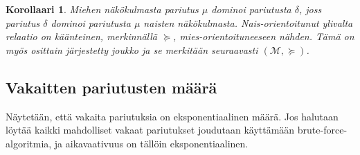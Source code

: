 \documentclass[finnish]{tktltiki2}
\newtheorem{kor}[lau]{Korollaari}
\theoremstyle{definition}
\theoremstyle{remark}
\begin{document}
\begin{kor}\cite[s. 19]{gusfield1989stable}
Miehen näkökulmasta pariutus $\mu$ dominoi pariutusta $\delta$, joss pariutus $\delta$ dominoi pariutusta $\mu$ naisten näkökulmasta. \emph{Nais-orientoitunut} ylivalta relaatio on käänteinen, merkinnällä $\succeq$, mies-orientoituneeseen nähden. Tämä on myös osittain järjestetty joukko ja se merkitään seuraavasti $(\mathcal{M}, \succeq)$. 
\end{kor}

\subsection{Vakaitten pariutusten määrä}
Näytetään, että vakaita pariutuksia on eksponentiaalinen määrä. Jos halutaan löytää kaikki mahdolliset vakaat pariutukset joudutaan käyttämään brute-force-algoritmia, ja aikavaativuus on tällöin eksponentiaalinen.
\end{document}
